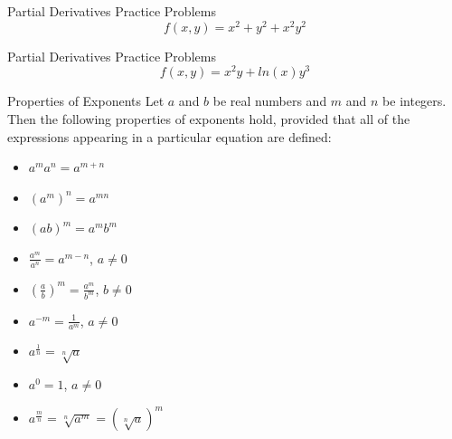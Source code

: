 \documentclass[aspectratio=169]{beamer}
\begin{document}
\begin{frame}{Partial Derivatives Practice Problems}\label{main1}
	\vspace{-4cm}
     \[
    f(x,y) = x^{2} + y^{2} + x^{2}y^{2}
    \]
\end{frame}

\begin{frame}{Partial Derivatives Practice Problems}\label{main1}
	\vspace{-4cm}
     \[
    f(x,y) = x^{2}y+ln(x)y^{3}
    \]
\end{frame}

\begin{frame}{Properties of Exponents}\label{main1}
\hypertarget{exponentslide}{}
Let $a$ and $b$ be real numbers and $m$ and $n$ be integers. Then the following properties of exponents hold, provided that all of the expressions appearing in a particular equation are defined:
\begin{itemize}
\begin{itemize}
    \item $a^m a^n = a^{m+n}$
    \item $(a^m)^n = a^{mn}$
    \item $(ab)^m = a^m b^m$
    \item $\frac{a^m}{a^n} = a^{m-n}$, $a \neq 0$
    \item $\left(\frac{a}{b}\right)^m = \frac{a^m}{b^m}$, $b \neq 0$
    \item $a^{-m} = \frac{1}{a^m}$, $a \neq 0$
    \item $a^{\frac{1}{n}} = \sqrt[n]{a}$
    \item $a^0 = 1$, $a \neq 0$
    \item $a^{\frac{m}{n}} = \sqrt[n]{a^m} = \left(\sqrt[n]{a}\right)^m$
\end{itemize}
\end{itemize}
\end{frame}
\end{document}
